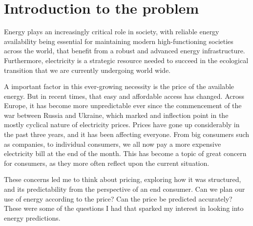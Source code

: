 \documentclass[12pt]{report} %
\begin{document}
\clearpage
{} %





\chapter{Introduction to the problem}

Energy plays an increasingly critical role in society, with reliable energy availability being essential for maintaining modern high-functioning societies across the world, that benefit from a robust and advanced energy infrastructure. Furthermore, electricity is a strategic resource needed to succeed in the ecological transition that we are currently undergoing world wide.


A important factor in this ever-growing necessity is the price of the available energy. But in recent times, that easy and affordable access has changed. Across Europe, it has become more unpredictable ever since the commencement of the war between Russia and Ukraine, which marked and inflection point in the mostly cyclical nature of electricity prices. Prices have gone up considerably in the past three years, and it has been affecting everyone. From big consumers such as companies, to individual consumers, we all now pay a more expensive electricity bill at the end of the month. This has become a topic of great concern for consumers, as they more often reflect upon the current situation.

These concerns led me to think about pricing, exploring how it was structured, and its predictability from the perspective of an end consumer. Can we plan our use of energy according to the price? Can the price be predicted accurately? These were some of the questions I had that sparked my interest in looking into energy predictions.
\end{document}
